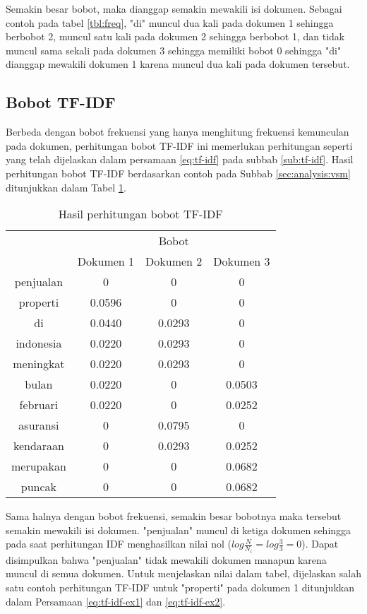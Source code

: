 Semakin besar bobot, maka \term dianggap semakin mewakili isi dokumen. Sebagai contoh pada tabel \ref{tbl:freq}, \term "di" muncul dua kali pada dokumen 1 sehingga berbobot 2, muncul satu kali pada dokumen 2 sehingga berbobot 1, dan tidak muncul sama sekali pada dokumen 3 sehingga memiliki bobot 0 sehingga \term "di" dianggap mewakili dokumen 1 karena muncul dua kali pada dokumen tersebut.

\subsection{Bobot TF-IDF}
Berbeda dengan bobot frekuensi yang hanya menghitung frekuensi kemunculan \term pada dokumen, perhitungan bobot TF-IDF ini memerlukan perhitungan seperti yang telah dijelaskan dalam persamaan \ref{eq:tf-idf} pada subbab \ref{sub:tf-idf}. Hasil perhitungan bobot TF-IDF berdasarkan contoh pada Subbab \ref{sec:analysis:vsm} ditunjukkan dalam Tabel \ref{tbl:tf-idf}.

\begin{table}[h]
	\centering
	\begin{tabular}{|c|c|c|c|} \hline
		\multirow{2}{*}{\Term} & \multicolumn{3}{c|}{Bobot} \\ \cline{2-4}
		& Dokumen 1 & Dokumen 2 & Dokumen 3 \\ \hline 
        penjualan & 0 & 0 & 0 \\ \hline
        properti & 0.0596 & 0 & 0 \\ \hline
        di & 0.0440 & 0.0293 & 0 \\ \hline
        indonesia & 0.0220 & 0.0293 & 0 \\ \hline
        meningkat & 0.0220 & 0.0293 & 0 \\ \hline
        bulan & 0.0220 & 0 & 0.0503 \\ \hline
        februari & 0.0220 & 0 & 0.0252 \\ \hline
        asuransi & 0 & 0.0795 & 0 \\ \hline
        kendaraan & 0 & 0.0293 & 0.0252 \\ \hline
        merupakan & 0 & 0 & 0.0682 \\ \hline
        puncak & 0 & 0 & 0.0682 \\ \hline
	\end{tabular}
	\caption{Hasil perhitungan bobot TF-IDF}
	\label{tbl:tf-idf}
\end{table}

Sama halnya dengan bobot frekuensi, semakin besar bobotnya maka \term tersebut semakin mewakili isi dokumen. \Term "penjualan" muncul di ketiga dokumen sehingga pada saat perhitungan IDF menghasilkan nilai nol ($log \frac{N}{N_i}=log \frac{3}{3} = 0$). Dapat disimpulkan bahwa \term "penjualan" tidak mewakili dokumen manapun karena muncul di semua dokumen. Untuk menjelaskan nilai dalam tabel, dijelaskan  salah satu contoh perhitungan TF-IDF untuk \term "properti" pada dokumen 1 ditunjukkan dalam Persamaan \ref{eq:tf-idf-ex1} dan \ref{eq:tf-idf-ex2}.

